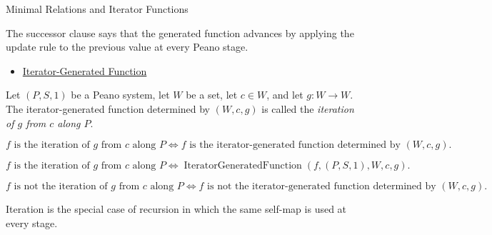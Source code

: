 \begin{topicbox}{Minimal Relations and Iterator Functions}
\begin{remark*}[Interpretation]
The successor clause says that the generated function advances by applying
the update rule to the previous value at every Peano stage.
\end{remark*}

\begin{remark*}[Dependencies]
\begin{itemize}
  \item \hyperref[def:iterator-generated-function]{Iterator-Generated Function}
\end{itemize}
\end{remark*}

\begin{tcolorbox}[colback=defbox, colframe=defborder, arc=2pt,
  left=6pt, right=6pt, top=4pt, bottom=4pt,
  title={\small\textbf{Definition (Iteration of a Self-Map)}},
  fonttitle=\small\bfseries]
\begin{definition}
\label{def:iteration-of-a-self-map}
Let $(P,S,1)$ be a Peano system, let $W$ be a set, let $c\in W$, and let
$g:W\to W$. The iterator-generated function determined by $(W,c,g)$ is called
the \emph{iteration of $g$ from $c$ along $P$}.
\end{definition}
\end{tcolorbox}

\begin{remark*}
\[
f \text{ is the iteration of } g \text{ from } c \text{ along } P
\Longleftrightarrow
f \text{ is the iterator-generated function determined by } (W,c,g).
\]
\end{remark*}

\begin{remark*}
\[
f \text{ is the iteration of } g \text{ from } c \text{ along } P
\Longleftrightarrow
\operatorname{IteratorGeneratedFunction}(f,(P,S,1),W,c,g).
\]
\end{remark*}

\begin{remark*}
\[
f \text{ is not the iteration of } g \text{ from } c \text{ along } P
\Longleftrightarrow
f \text{ is not the iterator-generated function determined by } (W,c,g).
\]
\end{remark*}

\begin{remark*}[Interpretation]
Iteration is the special case of recursion in which the same self-map is used
at every stage.
\end{remark*}


\end{topicbox}
